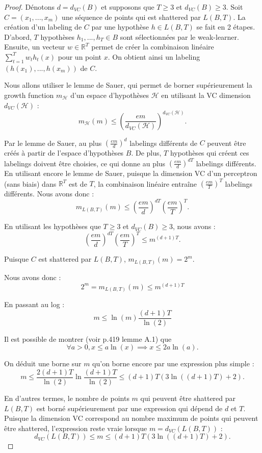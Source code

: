 \documentclass[12pt]{article}
\newcommand{\R}{\mathbb{R}}
\begin{document}
	\begin{proof}
	
	Dénotons $d = d_{VC}(B)$ et supposons que $T \geq 3$ et $d_{VC}(B) \geq 3$.
	Soit $C = (x_1, ..., x_m)$ une séquence de points qui est shattered par $L(B, T)$.
	La création d'un labeling de $C$ par une hypothèse $h \in L(B, T)$ se fait en 2 étapes.
	D'abord, $T$ hypothèses $h_1, ..., h_T \in B$ sont sélectionnées par le weak-learner.
	Ensuite, un vecteur $w \in \R^T$ permet de créer la combinaison linéaire $\sum_{t=1}^T w_t h_t(x)$ pour un point $x$.
	On obtient ainsi un labeling $(h(x_1), ..., h(x_m))$ de $C$.
	
	Nous allons utiliser le lemme de Sauer, qui permet de borner supérieurement la growth function $m_{\mathcal{H}}$ d'un espace d'hypothèses $\mathcal{H}$ en utilisant la VC dimension $d_{VC}(\mathcal{H})$ :
	\[
	m_{\mathcal{H}}(m) \leq \left( \frac{em}{d_{VC}(\mathcal{H})} \right) ^{d_{VC}(\mathcal{H})}.
	\]
	
	Par le lemme de Sauer, au plus $\left( \frac{em}{d} \right)^{d}$ labelings différents de $C$ peuvent être créés à partir de l'espace d'hypothèses $B$.
	De plus, $T$ hypothèses qui créent ces labelings doivent être choisies, ce qui donne au plus $\left( \frac{em}{d} \right) ^{d T}$ labelings différents.
	En utilisant encore le lemme de Sauer, puisque la dimension VC d'un perceptron (sans biais) dans $\R^T$ est de $T$, la combinaison linéaire entraîne $\left( \frac{em}{T} \right)^{T}$ labelings différents.
	Nous avons donc :
	\[
	m_{L(B, T)}(m) \leq \left( \frac{em}{d} \right) ^{d T} \left( \frac{em}{T} \right)^{T}.
	\]
	
	En utilisant les hypothèses que $T \geq 3$ et $d_{VC}(B) \geq 3$, nous avons :
	\[
	\left( \frac{em}{d} \right) ^{d T} \left( \frac{em}{T} \right)^{T} \leq m^{(d + 1) T}.
	\]
	
	Puisque $C$ est shattered par $L(B, T)$, $m_{L(B, T)}(m) = 2^m$.
	
	Nous avons donc :
	\[
	2^m = m_{L(B, T)}(m) \leq m^{(d + 1) T}
	\]
	
	En passant au log :
	\[
	m \leq \ln(m) \frac{(d + 1) T}{\ln(2)}
	\]
	
	Il est possible de montrer (voir \cite{Shalev-Shwartz2014-ba} p.419 lemme A.1) que
	\[
	\forall a > 0, x \leq a \ln(x) \implies x \leq 2 a \ln(a).
	\]
	
	On déduit une borne sur $m$ qu'on borne encore par une expression plus simple :
	\[
	m \leq \frac{2 (d + 1) T}{\ln(2)} \ln \frac{(d + 1) T}{\ln(2)} \leq (d + 1) T (3 \ln((d + 1) T) + 2).
	\]
	
	En d'autres termes, le nombre de points $m$ qui peuvent être shattered par $L(B, T)$ est borné supérieurement par une expression qui dépend de $d$ et $T$.
	Puisque la dimension VC correspond au nombre maximum de points qui peuvent être shattered, l'expression reste vraie lorsque $m = d_{VC}(L(B, T))$ :
	\[
	d_{VC}(L(B, T)) \leq m \leq (d + 1) T (3 \ln((d + 1) T) + 2).
	\]
	\end{proof}
	
\end{document}
